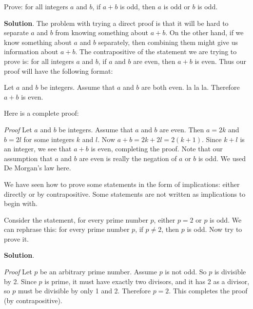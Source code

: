 \documentclass[11pt,]{book}
\makeatletter
\theoremstyle{ptxplainnotitle}
\theoremstyle{ptxplaintitle}
\renewcommand*{\proofname}{Proof}
\renewenvironment{proof}[1][\proofname]{\par
  \pushQED{\qed}%
  \normalfont \topsep6\p@\@plus6\p@\relax
  \trivlist
  \item\relax
    {\itshape
    #1\@addpunct{.}}\hspace\labelsep\ignorespaces
}{%
  \popQED\endtrivlist\@endpefalse
}
\theoremstyle{ptxdefinitionnotitle}
\theoremstyle{ptxdefinitiontitle}
\theoremstyle{ptxdefinitionnotitle}
\theoremstyle{ptxdefinitiontitle}
\theoremstyle{ptxdefinitionnotitle}
\theoremstyle{ptxdefinitiontitle}
\theoremstyle{ptxdefinitiontitlenonumber}
\theoremstyle{ptxdefinitiontitlenonumber}
\numberwithin{equation}{chapter}
\makeatother
\begin{document}
\begin{example}\label{example-66}
\hypertarget{p-2413}{}%
Prove: for all integers \(a\) and \(b\), if \(a + b\) is odd, then \(a\) is odd or \(b\) is odd.%
\par\smallskip%
\noindent\textbf{Solution}.\hypertarget{solution-249}{}\quad%
\hypertarget{p-2414}{}%
The problem with trying a direct proof is that it will be hard to separate \(a\) and \(b\) from knowing something about \(a+b\). On the other hand, if we know something about \(a\) and \(b\) separately, then combining them might give us information about \(a+b\). The contrapositive of the statement we are trying to prove is: for all integers \(a\) and \(b\), if \(a\) and \(b\) are even, then \(a+b\) is even. Thus our proof will have the following format:%
\par
\hypertarget{p-2415}{}%
Let \(a\) and \(b\) be integers. Assume that \(a\) and \(b\) are both even. la la la. Therefore \(a+b\) is even.%
\par
\hypertarget{p-2416}{}%
Here is a complete proof:%
\begin{proof}\hypertarget{proof-25}{}
\hypertarget{p-2417}{}%
Let \(a\) and \(b\) be integers. Assume that \(a\) and \(b\) are even. Then \(a = 2k\) and \(b = 2l\) for some integers \(k\) and \(l\). Now \(a + b = 2k + 2l = 2(k+1)\). Since \(k + l\) is an integer, we see that \(a + b\) is even, completing the proof.%
\end{proof}
\hypertarget{p-2418}{}%
Note that our assumption that \(a\) and \(b\) are even is really the negation of \(a\) or \(b\) is odd. We used De Morgan's law here.%
\end{example}
\hypertarget{p-2419}{}%
We have seen how to prove some statements in the form of implications: either directly or by contrapositive. Some statements are not written as implications to begin with.%
\begin{example}\label{example-67}
\hypertarget{p-2420}{}%
Consider the statement, for every prime number \(p\), either \(p = 2\) or \(p\) is odd. We can rephrase this: for every prime number \(p\), if \(p \ne 2\), then \(p\) is odd. Now try to prove it.%
\par\smallskip%
\noindent\textbf{Solution}.\hypertarget{solution-250}{}\quad%
\begin{proof}\hypertarget{proof-26}{}
\hypertarget{p-2421}{}%
Let \(p\) be an arbitrary prime number. Assume \(p\) is not odd. So \(p\) is divisible by 2. Since \(p\) is prime, it must have exactly two divisors, and it has 2 as a divisor, so \(p\) must be divisible by only 1 and 2. Therefore \(p = 2\). This completes the proof (by contrapositive).%
\end{proof}
\end{example}
\typeout{************************************************}
\typeout{************************************************}
\end{document}
